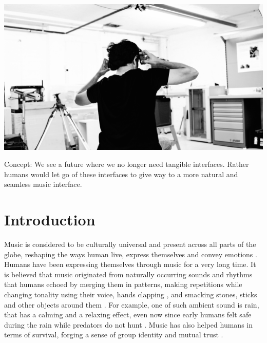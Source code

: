 \documentclass[sigchi]{acmart}
\begin{document}
\begin{teaserfigure}
  \includegraphics[width=\textwidth]{acmart-master-2/samples/test2bw.png}
  \caption{Concept: We see a future where we no longer need tangible interfaces. Rather humans would let go of these interfaces to give way to a more natural and seamless music interface.}
  \label{fig:teaser}
\end{teaserfigure}
\maketitle

\section{Introduction}

Music is considered to be culturally universal \cite{campbell1997music, seeger1971reflections} and present across all parts of the globe, reshaping the ways human live, express themselves and convey emotions  \cite{juslin2001music,montagu2017music}. Humans have been expressing themselves through music for a very long time.  It is believed that music originated from naturally occurring sounds and rhythms that humans echoed by merging them in patterns, making repetitions while changing tonality using their voice, hands clapping \cite{kassler1987dancing}, and smacking stones, sticks and other objects around them \cite{montagu2014horns}. For example, one of such ambient sound is rain, that has a calming and a relaxing effect, even now since early humans felt safe during the rain while predators do not hunt \cite{aramaki2017bridging}. Music has also helped humans 
in terms of survival, forging a sense of group identity and mutual trust \cite{conard2009new}.
\end{document}
